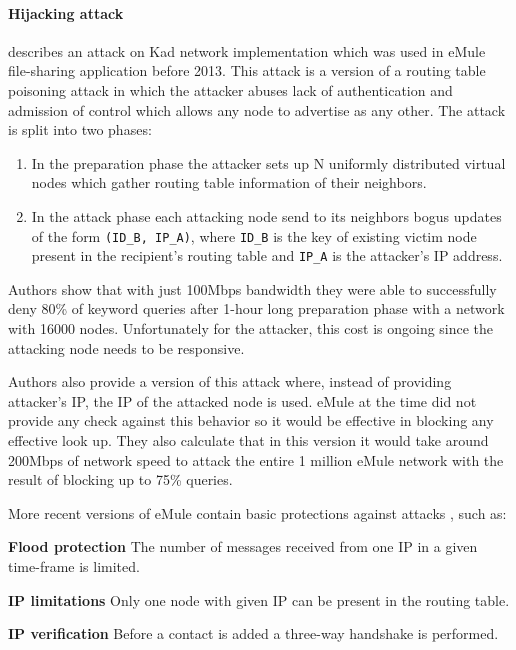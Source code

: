 \paragraph{Hijacking attack}
\cite{wan08} describes an attack on Kad network implementation which was used
in eMule file-sharing application before 2013. This attack is a version of a
routing table poisoning attack in which the attacker abuses lack of
authentication and admission of control which allows any node to advertise as
any other. The attack is split into two phases:
\begin{enumerate}
  \item In the preparation phase the attacker sets up N uniformly distributed
    virtual nodes which gather routing table information of their neighbors.
  \item In the attack phase each attacking node send to its neighbors bogus
    updates of the form \texttt{(ID\_B, IP\_A)}, where \texttt{ID\_B} is the key
    of existing victim node present in the recipient's routing table and
    \texttt{IP\_A} is the attacker's IP address.
\end{enumerate}

Authors show that with just 100Mbps bandwidth they were able to successfully
deny 80\% of keyword queries after 1-hour long preparation phase with a
network with 16000 nodes.
Unfortunately for the attacker, this cost is ongoing since the attacking node
needs to be responsive.

Authors also provide a version of this attack where, instead of providing
attacker's IP, the IP of the attacked node is used. eMule at the time did not
provide any check against this behavior so it would be effective in blocking
any effective look up. They also calculate that in this version it would take
around 200Mbps of network speed to attack the entire 1 million eMule network
with the result of blocking up to 75\% queries.

More recent versions of eMule contain basic protections against attacks
\cite{tim11}, such as:
\begin{description}
  \item{\textbf{Flood protection}} The number of messages received from one IP
    in a given time-frame is limited.
  \item{\textbf{IP limitations}} Only one node with given IP can be present in
    the routing table.
  \item{\textbf{IP verification}} Before a contact is added a three-way
    handshake is performed.
\end{description}

